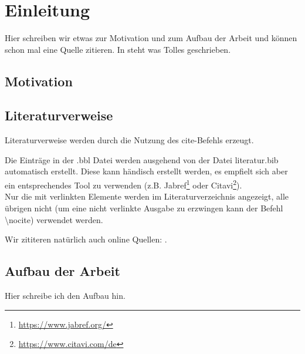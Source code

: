 \chapter{Einleitung}
\label{lab:einleitung}
Hier schreiben wir etwas zur Motivation und zum Aufbau der Arbeit und können schon mal eine Quelle zitieren. 
In \cite{Beispiel:1999} steht was Tolles geschrieben. 
\section{Motivation}
\section{Literaturverweise}\label{sec:literaturverweise}
%
Literaturverweise werden durch die Nutzung des cite-Befehls  \cite{ein_artikel} erzeugt.

Die Einträge in der .bbl Datei werden ausgehend von der Datei literatur.bib automatisch erstellt.
Diese kann händisch erstellt werden, es empfielt sich aber ein entsprechendes Tool zu verwenden (z.B. Jabref\footnote{\url{https://www.jabref.org/}} oder Citavi\footnote{\url{https://www.citavi.com/de}}).\\
Nur die mit verlinkten Elemente werden im Literaturverzeichnis angezeigt, alle übrigen nicht (um eine nicht verlinkte Ausgabe zu erzwingen kann der Befehl \textbackslash nocite) verwendet werden.
\nocite{eine_doktorarbeit}

Wir zititeren natürlich auch online Quellen: \cite{Wikipedia:2021}.

\section{Aufbau der Arbeit}
Hier schreibe ich den Aufbau hin. 